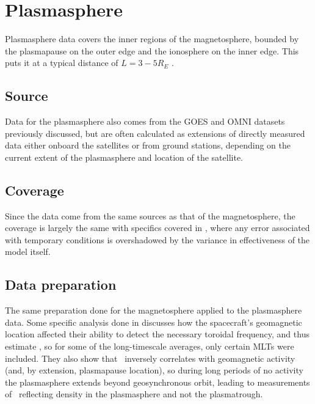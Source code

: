 \section{Plasmasphere}
Plasmasphere data covers the inner regions of the magnetosphere, bounded by the plasmapause on the outer edge and the ionosphere on the inner edge. This puts it at a typical distance of $L=3-5R_E$ \citep{Carpenter1992ISEEModel}. 

\subsection{Source}
Data for the plasmasphere also comes from the GOES and OMNI datasets previously discussed, but are often calculated as extensions of directly measured data either onboard the satellites or from ground stations, depending on the current extent of the plasmasphere and location of the satellite.

\subsection{Coverage}
Since the data come from the same sources as that of the magnetosphere, the coverage is largely the same with specifics covered in \cite{Takahashi2010SolarCycleVariation}, where any error associated with temporary conditions is overshadowed by the variance in effectiveness of the model itself. 

\subsection{Data preparation}
The same preparation done for the magnetosphere applied to the plasmasphere data.  Some specific analysis done in \cite{Takahashi2010SolarCycleVariation} discusses how the spacecraft's geomagnetic location affected their ability to detect the necessary toroidal frequency, and thus estimate \req, so for some of the long-timescale averages, only certain MLTs were included. They also show that \req\ inversely correlates with geomagnetic activity (and, by extension, plasmapause location), so during long periods of no activity the plasmasphere extends beyond geosynchronous orbit, leading to measurements of \req\ reflecting density in the plasmasphere and not the plasmatrough. 

